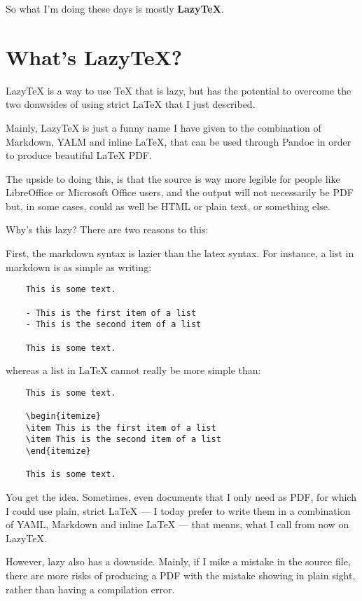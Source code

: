 \documentclass[english,]{amsart}
\begin{document}
So what I'm doing these days is mostly \textbf{Lazy\TeX}.

\section{What's LazyTeX?}\label{whats-lazytex}

LazyTeX is a way to use TeX that is lazy, but has the potential to
overcome the two donwsides of using strict LaTeX that I just described.

Mainly, LazyTeX is just a funny name I have given to the combination of
Markdown, YALM and inline LaTeX, that can be used through Pandoc in
order to produce beautiful LaTeX PDF.

The upside to doing this, is that the source is way more legible for
people like LibreOffice or Microsoft Office users, and the output will
not necessarily be PDF but, in some cases, could as well be HTML or
plain text, or something else.

Why's this lazy? There are two reasons to this:

First, the markdown syntax is lazier than the latex syntax. For
instance, a list in markdown is as simple as writing:

\begin{verbatim}
    This is some text.

    - This is the first item of a list
    - This is the second item of a list

    This is some text.
\end{verbatim}

whereas a list in LaTeX cannot really be more simple than:

\begin{verbatim}
    This is some text.

    \begin{itemize}
    \item This is the first item of a list
    \item This is the second item of a list
    \end{itemize}

    This is some text.
\end{verbatim}

You get the idea. Sometimes, even documents that I only need as PDF, for
which I could use plain, strict LaTeX --- I today prefer to write them
in a combination of YAML, Markdown and inline LaTeX --- that means, what
I call from now on LazyTeX.

However, lazy also has a downside. Mainly, if I mike a mistake in the
source file, there are more risks of producing a PDF with the mistake
showing in plain sight, rather than having a compilation error.
\end{document}
